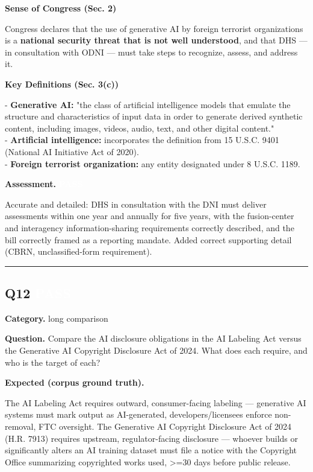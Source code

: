 \documentclass[11pt]{article}
\newcommand{\fieldlabel}[1]{\textbf{\color{navy}#1}\quad}
\begin{document}
\textbf{Sense of Congress (Sec. 2)}

Congress declares that the use of generative AI by foreign terrorist organizations is a \textbf{national security threat that is not well understood}, and that DHS --- in consultation with ODNI --- must take steps to recognize, assess, and address it.

\textbf{Key Definitions (Sec. 3(c))}

- \textbf{Generative AI:} "the class of artificial intelligence models that emulate the structure and characteristics of input data in order to generate derived synthetic content, including images, videos, audio, text, and other digital content." \\
- \textbf{Artificial intelligence:} incorporates the definition from 15 U.S.C. 9401 (National AI Initiative Act of 2020). \\
- \textbf{Foreign terrorist organization:} any entity designated under 8 U.S.C. 1189.

\fieldlabel{Assessment.} \colorbox{passgreen}{\textcolor{white}{\bfseries PASS}}\par
Accurate and detailed: DHS in consultation with the DNI must deliver assessments within one year and annually for five years, with the fusion-center and interagency information-sharing requirements correctly described, and the bill correctly framed as a reporting mandate. Added correct supporting detail (CBRN, unclassified-form requirement).
\vspace{4pt}\hrule\vspace{8pt}
\subsection*{Q12 \quad \colorbox{passgreen}{\textcolor{white}{\bfseries PASS}}}
\fieldlabel{Category.} long comparison\par
\fieldlabel{Question.} Compare the AI disclosure obligations in the AI Labeling Act versus the Generative AI Copyright Disclosure Act of 2024. What does each require, and who is the target of each?\par
\fieldlabel{Expected (corpus ground truth).}\par
The AI Labeling Act requires outward, consumer-facing labeling --- generative AI systems must mark output as AI-generated, developers/licensees enforce non-removal, FTC oversight. The Generative AI Copyright Disclosure Act of 2024 (H.R. 7913) requires upstream, regulator-facing disclosure --- whoever builds or significantly alters an AI training dataset must file a notice with the Copyright Office summarizing copyrighted works used, \textgreater{}=30 days before public release.
\end{document}
